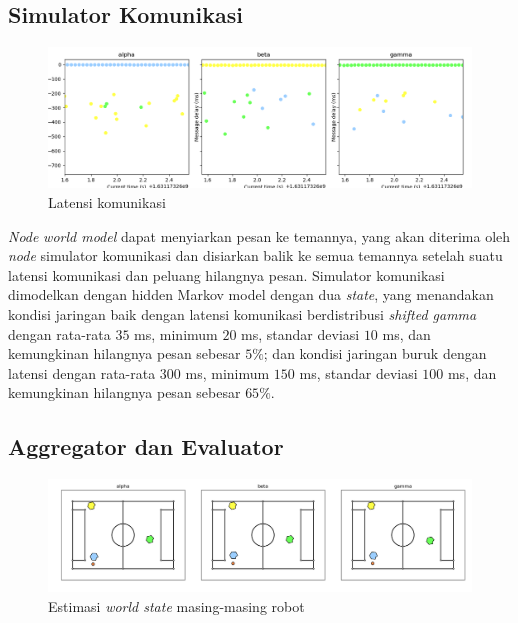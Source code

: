\subsection{Simulator Komunikasi}

\begin{figure}[h]
    \centering
    \medskip
    \includegraphics[width=\textwidth]{resources/allies-comm.png}
    \caption{Latensi komunikasi}
    \label{fig:allies-comm}
    \bigskip
\end{figure}

\textit{Node} \textit{world model} dapat menyiarkan pesan ke temannya, yang akan diterima oleh \textit{node} simulator komunikasi dan disiarkan balik ke semua temannya setelah suatu latensi komunikasi dan peluang hilangnya pesan. Simulator komunikasi dimodelkan dengan hidden Markov model dengan dua \textit{state}, yang menandakan kondisi jaringan baik dengan latensi komunikasi berdistribusi \textit{shifted gamma} dengan rata-rata $35$ ms, minimum $20$ ms, standar deviasi $10$ ms, dan kemungkinan hilangnya pesan sebesar $5\%$; dan kondisi jaringan buruk dengan latensi dengan rata-rata $300$ ms, minimum $150$ ms, standar deviasi $100$ ms, dan kemungkinan hilangnya pesan sebesar $65\%$.

\subsection{Aggregator dan Evaluator}

\begin{figure}[h]
    \centering
    \medskip
    \includegraphics[width=\textwidth]{resources/allies-world-model.png}
    \caption{Estimasi \textit{world state} masing-masing robot}
    \label{fig:allies-world-model}
    \bigskip
\end{figure}

